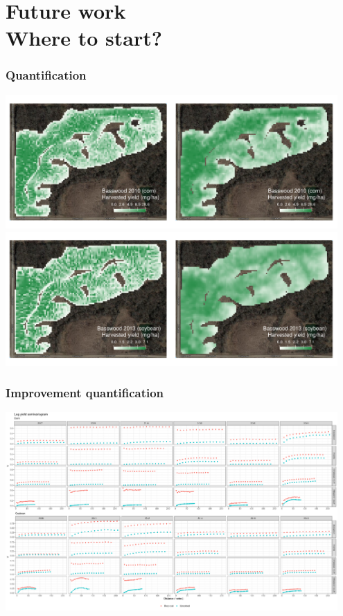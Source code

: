 \documentclass{beamer}
\begin{document}
\section{Future work \\ \small{Where to start?}}

\begin{frame}
  \frametitle{Quantification}

  \includegraphics[width=0.95\textwidth]{./figures/maps/basswood_2010_07_gallery_res5_5.png}
  \includegraphics[width=0.95\textwidth]{./figures/maps/basswood_2013_07_gallery_res5_5.png}
  
\end{frame}

\begin{frame}
  \frametitle{Improvement quantification}

  \includegraphics[width=0.95\textwidth]{./figures/semivariograms.png}

\end{frame}
\end{document}
